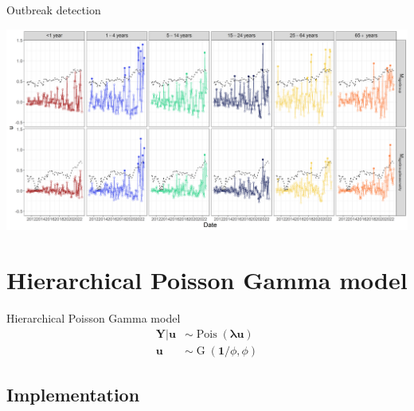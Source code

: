 \documentclass[aspectratio=169]{beamer}
\DeclareMathOperator{\G}{G}
\DeclareMathOperator{\Pois}{Pois}
\begin{document}
\begin{frame}{Outbreak detection}
\protect\hypertarget{outbreak-detection}{}
\tiny

\includegraphics[width=1\linewidth]{../figures/OutbreakDetectionxSTEC_PoisN}

\normalsize
\end{frame}

\hypertarget{hierarchical-poisson-gamma-model}{%
\section{Hierarchical Poisson Gamma
model}\label{hierarchical-poisson-gamma-model}}

\begin{frame}{Hierarchical Poisson Gamma model}
\begin{subequations} \label{eq:PoisGam}
  \begin{alignat}{2}
    \boldsymbol{Y|u} &\sim \Pois (\boldsymbol{\lambda u}) \label{eq:pois_g0} \\ 
    \boldsymbol{u} &\sim \G(\boldsymbol 1/\phi,\phi) \label{eq:pois_g1}
  \end{alignat}
\end{subequations}
\end{frame}

\hypertarget{implementation-1}{%
\subsection{Implementation}\label{implementation-1}}
\end{document}
